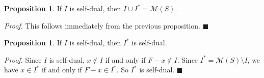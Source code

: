 \documentclass{article}
\theoremstyle{definition}
\theoremstyle{definition}
\theoremstyle{definition}
\newtheorem{prop}[thm]{Proposition}
\begin{document}
\begin{prop}
    If $I$ is self-dual, then $I\cup I^* = \mathcal{M}(S)$.
    \medskip
    
    \textit{Proof.} This follows immediately from the previous proposition. $\blacksquare$
    
\end{prop}

\begin{prop}
    If $I$ is self-dual, then $I^*$ is self-dual. 
    \medskip

    \textit{Proof.} Since $I$ is self-dual, $x \notin I$ if and only if $F - x \notin I$. Since $I^* = \mathcal{M}(S) \setminus I$, we have $x\in I^*$ if and only if $F-x \in I^*$. So $I^*$ is self-dual. $\blacksquare$
    
\end{prop}
    
\end{document}
